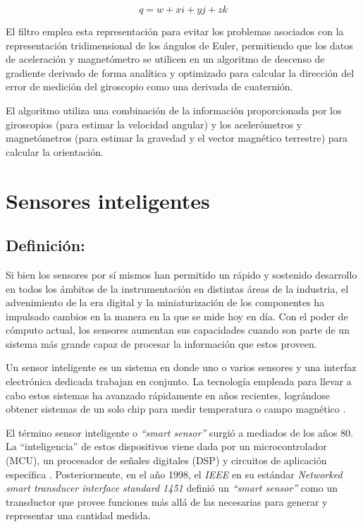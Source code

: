 \begin{itemize}
    \begin{equation}
        q = w + xi + yj + zk
    \end{equation}

    El filtro emplea esta representación para evitar los problemas asociados con la representación tridimensional de los ángulos de Euler, permitiendo que los datos de aceleración y magnetómetro se utilicen en un algoritmo de descenso de gradiente derivado de forma analítica y optimizado para calcular la dirección del error de medición del giroscopio como una derivada de cuaternión.

    El algoritmo utiliza una combinación de la información proporcionada por los giroscopios (para estimar la velocidad angular) y los acelerómetros y magnetómetros (para estimar la gravedad y el vector magnético terrestre) para calcular la orientación.
\end{itemize}

\section{Sensores inteligentes}

\subsection{Definición:}

Si bien los sensores por sí mismos han permitido un rápido y sostenido desarrollo en todos los ámbitos de la instrumentación en distintas áreas de la industria, el advenimiento de la era digital y la miniaturización de los componentes ha impulsado cambios en la manera en la que se mide hoy en día. Con el poder de cómputo actual, los sensores aumentan sus capacidades cuando son parte de un sistema más grande capaz de procesar la información que estos proveen.

Un sensor inteligente es un sistema en donde uno o varios sensores y una interfaz electrónica dedicada trabajan en conjunto. La tecnología empleada para llevar a cabo estos sistemas ha avanzado rápidamente en años recientes, lográndose obtener sistemas de un solo chip para medir temperatura o campo magnético \citep{nagayama2007structural}.


El término sensor inteligente o \textit{``smart sensor''} surgió a mediados de los años 80. La ``inteligencia'' de estos dispositivos viene dada por un microcontrolador (MCU), un procesador de señales digitales (DSP) y circuitos de aplicación específica \citep{frank2002understanding}. Posteriormente, en el año 1998, el \textit{IEEE} en su estándar \textit{Networked smart transducer interface standard 1451} definió un \textit{``smart sensor''} como un transductor que provee funciones más allá de las necesarias para generar y representar una cantidad medida.

